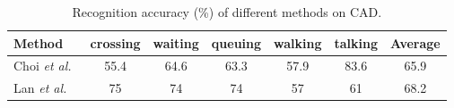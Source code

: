 \documentclass[9pt,journal,letterpaper,twocolumn]{IEEEtran}
\begin{document}
		\begin{table}[!t]
			\vspace{-2mm}
		\caption{{Recognition accuracy (\%) of different methods on CAD.}}
		\vspace{-3mm}
		{\scriptsize
			\begin{center}
				\begin{tabular}{lc cc ccc}
					\hline
					\centering
					\hspace{-0.5em}Method & \hspace{-0.5em}crossing\hspace{-0.5em} &\hspace{-0.5em} waiting\hspace{-0.5em} & \hspace{-0.5em}queuing\hspace{-0.5em} & \hspace{-0.5em}walking\hspace{-0.5em} & \hspace{-0.5em}talking\hspace{-0.5em} & \hspace{-0.5em}Average\hspace{-0.5em}  \\
					\hline
					\hspace{-0.5em}Choi {\em et al.}~\cite{choi2009they}\hspace{-0.5em} & \hspace{-0.5em}55.4\hspace{-0.5em} & \hspace{-0.5em}64.6\hspace{-0.5em} & \hspace{-0.5em}63.3\hspace{-0.5em} & \hspace{-0.5em}57.9\hspace{-0.5em}  & \hspace{-0.5em}83.6\hspace{-0.5em} & \hspace{-0.5em}65.9\hspace{-0.5em} \\
					\hspace{-0.5em}Lan {\em et al.}~\cite{lan2010retrieving}\hspace{-0.5em}& \hspace{-0.5em}75\hspace{-0.5em} & \hspace{-0.5em}74\hspace{-0.5em} & \hspace{-0.5em}74\hspace{-0.5em}& \hspace{-0.5em}57 &61  & 68.2  \\

\end{tabular}
\end{center}}
\end{table}
\end{document}
